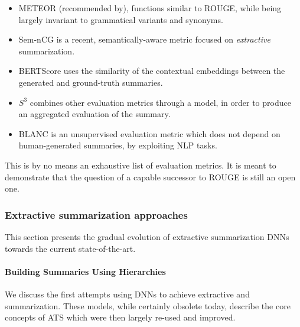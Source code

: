 \documentclass[preprint,review,12pt]{elsarticle}
\begin{document}
\begin{itemize}
    \item METEOR \cite{meteor} (recommended by\citet{suleiman}), functions similar to ROUGE, while being largely invariant to grammatical variants and synonyms.
    \item Sem-nCG \citet{akter} is a recent, semantically-aware metric focused on \textit{extractive} summarization.
    \item BERTScore \cite{bert_score} uses the similarity of the contextual embeddings between the generated and ground-truth summaries.
    \item $S^{3}$ \cite{s3} combines other evaluation metrics through a model, in order to produce an aggregated evaluation of the summary.
    \item BLANC \cite{blanc} is an unsupervised evaluation metric which does not depend on human-generated summaries, by exploiting NLP tasks.
\end{itemize}
This is by no means an exhaustive list of evaluation metrics. It is meant to demonstrate that the question of a capable successor to ROUGE is still an open one.

\subsubsection{Extractive summarization approaches}
\label{sssec:extractive}
This section presents the gradual evolution of extractive summarization DNNs towards the current state-of-the-art.\\

\paragraph{Building Summaries Using Hierarchies} We discuss the first attempts using DNNs to achieve extractive and summarization. These models, while certainly obsolete today, describe the core concepts of ATS which were then largely re-used and improved.


	
\end{document}
